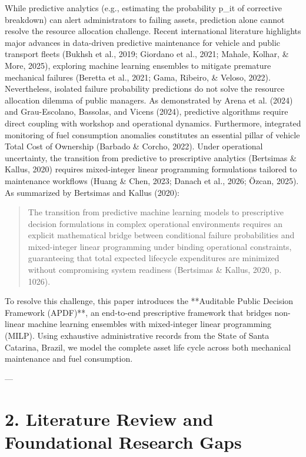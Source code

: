 \documentclass[10pt,a4paper,journal]{article}
\begin{document}
While predictive analytics (e.g., estimating the probability p\_it of corrective breakdown) can alert administrators to failing assets, prediction alone cannot resolve the resource allocation challenge. Recent international literature highlights major advances in data-driven predictive maintenance for vehicle and public transport fleets (Bukhsh et al., 2019; Giordano et al., 2021; Mahale, Kolhar, \& More, 2025), exploring machine learning ensembles to mitigate premature mechanical failures (Beretta et al., 2021; Gama, Ribeiro, \& Veloso, 2022). Nevertheless, isolated failure probability predictions do not solve the resource allocation dilemma of public managers. As demonstrated by Arena et al. (2024) and Grau-Escolano, Bassolas, and Vicens (2024), predictive algorithms require direct coupling with workshop and operational dynamics. Furthermore, integrated monitoring of fuel consumption anomalies constitutes an essential pillar of vehicle Total Cost of Ownership (Barbado \& Corcho, 2022). Under operational uncertainty, the transition from predictive to prescriptive analytics (Bertsimas \& Kallus, 2020) requires mixed-integer linear programming formulations tailored to maintenance workflows (Huang \& Chen, 2023; Danach et al., 2026; Özcan, 2025). As summarized by Bertsimas and Kallus (2020):

\begin{quote}
\small The transition from predictive machine learning models to prescriptive decision formulations in complex operational environments requires an explicit mathematical bridge between conditional failure probabilities and mixed-integer linear programming under binding operational constraints, guaranteeing that total expected lifecycle expenditures are minimized without compromising system readiness (Bertsimas \& Kallus, 2020, p. 1026).
\end{quote}
To resolve this challenge, this paper introduces the **Auditable Public Decision Framework (APDF)**, an end-to-end prescriptive framework that bridges non-linear machine learning ensembles with mixed-integer linear programming (MILP). Using exhaustive administrative records from the State of Santa Catarina, Brazil, we model the complete asset life cycle across both mechanical maintenance and fuel consumption.

---

\section{2. Literature Review and Foundational Research Gaps}
\end{document}
